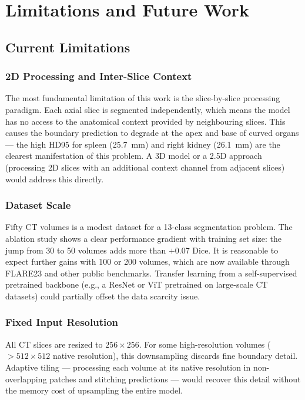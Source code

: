\chapter{Limitations and Future Work}
\label{chap:future}

\section{Current Limitations}

\subsection{2D Processing and Inter-Slice Context}

The most fundamental limitation of this work is the slice-by-slice processing paradigm. Each
axial slice is segmented independently, which means the model has no access to the anatomical
context provided by neighbouring slices. This causes the boundary prediction to degrade at the
apex and base of curved organs --- the high HD95 for spleen (25.7~mm) and right kidney
(26.1~mm) are the clearest manifestation of this problem. A 3D model or a 2.5D approach
(processing 2D slices with an additional context channel from adjacent slices) would address
this directly.

\subsection{Dataset Scale}

Fifty CT volumes is a modest dataset for a 13-class segmentation problem. The ablation study
shows a clear performance gradient with training set size: the jump from 30 to 50 volumes adds
more than $+$0.07 Dice. It is reasonable to expect further gains with 100 or 200 volumes, which
are now available through FLARE23 and other public benchmarks. Transfer learning from a
self-supervised pretrained backbone (e.g., a ResNet or ViT pretrained on large-scale CT
datasets) could partially offset the data scarcity issue.

\subsection{Fixed Input Resolution}

All CT slices are resized to $256 \times 256$. For some high-resolution volumes ($> 512 \times
512$ native resolution), this downsampling discards fine boundary detail. Adaptive tiling
--- processing each volume at its native resolution in non-overlapping patches and stitching
predictions --- would recover this detail without the memory cost of upsampling the entire
model.


